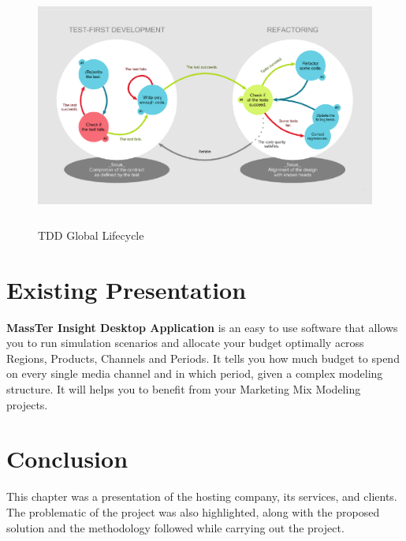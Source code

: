 		\begin{figure}[h]
		\centering
		\includegraphics[width=13cm,height=8cm]{TDD_Global_Lifecycle.png}
		\caption[TDD Global Lifecycle]{TDD Global Lifecycle \cite{ref5}}
		\label{TDD_Global_Lifecycle}
	\end{figure}   
	\section{Existing Presentation}
	\textbf{MassTer Insight Desktop Application} is an easy to use software that allows you to run simulation scenarios and allocate your budget optimally across Regions, Products, Channels and Periods. It tells you how much budget to spend on every single media channel and in which period, given a complex modeling structure. It will helps you to benefit from your Marketing Mix Modeling projects. 

	\section{Conclusion}
	This chapter was a presentation of the hosting company, its services, and clients. The problematic of the project was also highlighted, along with the proposed solution and the methodology followed while carrying out the project.

	

